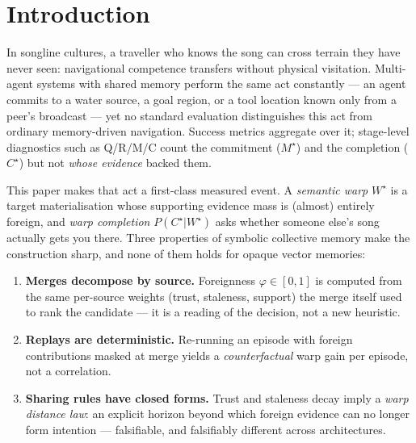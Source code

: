 \documentclass{article}
\newcommand{\wstar}{W^{\star}}
\newcommand{\mstar}{M^{\star}}
\newcommand{\cstar}{C^{\star}}
\begin{document}
\FloatBarrier
\section{Introduction}
\label{p2:sec:intro}

In songline cultures, a traveller who knows the song can cross terrain
they have never seen: navigational competence transfers without
physical visitation. Multi-agent systems with shared memory perform
the same act constantly --- an agent commits to a water source, a goal
region, or a tool location known only from a peer's broadcast --- yet
no standard evaluation distinguishes this act from ordinary
memory-driven navigation. Success metrics aggregate over it;
stage-level diagnostics such as Q/R/M/C count the commitment
($\mstar$) and the completion ($\cstar$) but not \emph{whose evidence}
backed them.

This paper makes that act a first-class measured event. A
\emph{semantic warp} $\wstar$ is a target materialisation whose
supporting evidence mass is (almost) entirely foreign, and
\emph{warp completion} $P(\cstar|\wstar)$ asks whether someone else's
song actually gets you there. Three properties of symbolic collective
memory make the construction sharp, and none of them holds for opaque
vector memories:

\begin{enumerate}[leftmargin=20pt,itemsep=2pt,topsep=2pt]
\item \textbf{Merges decompose by source.} Foreignness
  $\varphi\in[0,1]$ is computed from the same per-source weights
  (trust, staleness, support) the merge itself used to rank the
  candidate --- it is a reading of the decision, not a new heuristic.
\item \textbf{Replays are deterministic.} Re-running an episode with
  foreign contributions masked at merge yields a \emph{counterfactual}
  warp gain per episode, not a correlation.
\item \textbf{Sharing rules have closed forms.} Trust and staleness
  decay imply a \emph{warp distance law}: an explicit horizon beyond
  which foreign evidence can no longer form intention --- falsifiable,
  and falsifiably different across architectures.
\end{enumerate}
\end{document}
